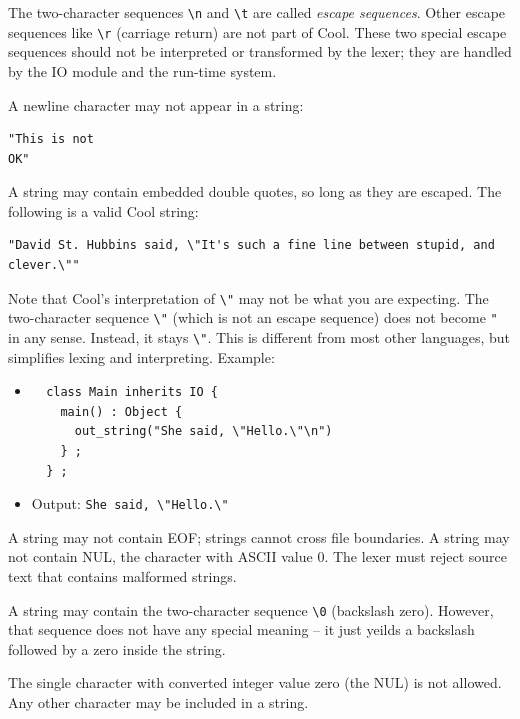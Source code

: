 \documentclass[]{article}
\begin{document}
The two-character sequences \texttt{\textbackslash{}n} and
\texttt{\textbackslash{}t} are called \emph{escape sequences}. Other
escape sequences like \texttt{\textbackslash{}r} (carriage return) are
not part of Cool. These two special escape sequences should not be
interpreted or transformed by the lexer; they are handled by the IO
module and the run-time system.

A newline character may not appear in a string:

\begin{verbatim}
"This is not
OK"
\end{verbatim}

A string may contain embedded double quotes, so long as they are
escaped. The following is a valid Cool string:

\begin{verbatim}
"David St. Hubbins said, \"It's such a fine line between stupid, and clever.\""
\end{verbatim}

Note that Cool's interpretation of \texttt{\textbackslash{}"} may not be
what you are expecting. The two-character sequence
\texttt{\textbackslash{}"} (which is not an escape sequence) does not
become \texttt{"} in any sense. Instead, it stays
\texttt{\textbackslash{}"}. This is different from most other languages,
but simplifies lexing and interpreting. Example:

\begin{itemize}
\item
\begin{verbatim}
  class Main inherits IO {
    main() : Object { 
      out_string("She said, \"Hello.\"\n") 
    } ;
  } ; 
\end{verbatim}
\item
  Output: \texttt{She said, \textbackslash{}"Hello.\textbackslash{}"}
\end{itemize}

A string may not contain EOF; strings cannot cross file boundaries. A
string may not contain NUL, the character with ASCII value 0. The lexer
must reject source text that contains malformed strings.

A string may contain the two-character sequence
\texttt{\textbackslash{}0} (backslash zero). However, that sequence does
not have any special meaning -- it just yeilds a backslash followed by a
zero inside the string.

The single character with converted integer value zero (the NUL) is not
allowed. Any other character may be included in a string.
\end{document}
